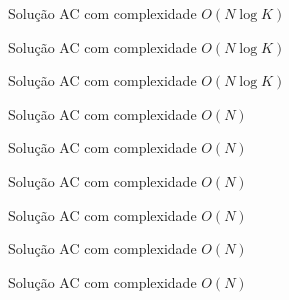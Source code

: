 \begin{frame}[fragile]{Solução AC com complexidade $O(N\log K)$}
\end{frame}

\begin{frame}[fragile]{Solução AC com complexidade $O(N\log K)$}
\end{frame}

\begin{frame}[fragile]{Solução AC com complexidade $O(N\log K)$}
\end{frame}

\begin{frame}[fragile]{Solução AC com complexidade $O(N)$}
\end{frame}

\begin{frame}[fragile]{Solução AC com complexidade $O(N)$}
\end{frame}

\begin{frame}[fragile]{Solução AC com complexidade $O(N)$}
\end{frame}

\begin{frame}[fragile]{Solução AC com complexidade $O(N)$}
\end{frame}

\begin{frame}[fragile]{Solução AC com complexidade $O(N)$}
\end{frame}

\begin{frame}[fragile]{Solução AC com complexidade $O(N)$}
\end{frame}
